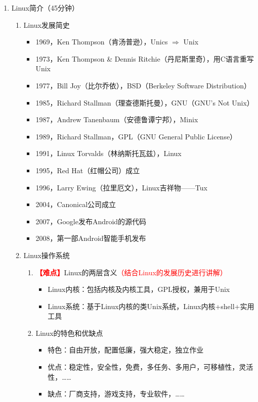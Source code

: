 \documentclass{TIJMUjiaoanLL}
\begin{document}
\begin{enumerate}
  \item Linux简介（45分钟）
    \begin{enumerate}
      \item Linux发展简史
	\begin{itemize}
          \item 1969，Ken Thompson（肯\textbullet 汤普逊），Unics $\Rightarrow$ Unix
          \item 1973，Ken Thompson \& Dennis Ritchie（丹尼斯\textbullet 里奇），用C语言重写Unix
          \item 1977，Bill Joy（比尔\textbullet 乔依），BSD（Berkeley Software Distribution）
	  \item 1985，Richard Stallman（理查德\textbullet 斯托曼），GNU（GNU's Not Unix）
          \item 1987，Andrew Tanenbaum（安德鲁\textbullet 谭宁邦），Minix
          \item 1989，Richard Stallman，GPL（GNU General Public License）
          \item 1991，Linux Torvalds（林纳斯\textbullet 托瓦兹），Linux
          \item 1995，Red Hat（红帽公司）成立
          \item 1996，Larry Ewing（拉里\textbullet 厄文），Linux吉祥物——Tux
          \item 2004，Canonical公司成立
          \item 2007，Google发布Android的源代码
          \item 2008，第一部Android智能手机发布
	\end{itemize}
      \item Linux操作系统
	\begin{enumerate}
	  \item \textcolor{red}{\textbf{【难点】}}Linux的两层含义\textcolor{red}{（结合Linux的发展历史进行讲解）}
	    \begin{itemize}
	      \item Linux内核：包括内核及内核工具，GPL授权，兼用于Unix
	      \item Linux系统：基于Linux内核的类Unix系统，Linux内核+shell+实用工具
	    \end{itemize}
	  \item Linux的特色和优缺点
	    \begin{itemize}
	      \item 特色：自由开放，配置低廉，强大稳定，独立作业
	      \item 优点：稳定性，安全性，免费，多任务、多用户，可移植性，灵活性，……
	      \item 缺点：厂商支持，游戏支持，专业软件，……

\end{itemize}
\end{enumerate}
\end{enumerate}
\end{enumerate}
\end{document}
